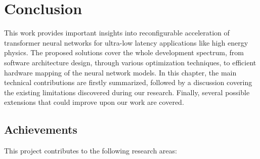 \chapter{Conclusion}\label{conclusion}
This work provides important insights into reconfigurable acceleration of transformer neural networks for ultra-low latency applications like high energy physics. The proposed solutions cover the whole development spectrum, from software architecture design, through various optimization techniques, to efficient hardware mapping of the neural network models. In this chapter, the main technical contributions are firstly summarized, followed by a discussion covering the existing limitations discovered during our research. Finally, several possible extensions that could improve upon our work are covered.

\section{Achievements}
This project contributes to the following research areas:

